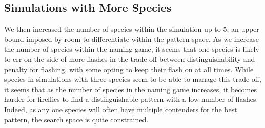 \subsection{Simulations with More Species}
We then increased the number of species within the simulation up to 5, an upper bound imposed by room to differentiate within the pattern space.
As we increase the number of species within the naming game, it seems that one species is likely to err on the side of more flashes in the trade-off between distinguishability and penalty for flashing, with some opting to keep their flash on at all times. 
While species in simulations with three species seem to be able to manage this trade-off, it seems that as the number of species in the naming game increases, it becomes harder for fireflies to find a distinguishable pattern with a low number of flashes. 
Indeed, as any one species will often have multiple contenders for the best pattern, the search space is quite constrained. 



